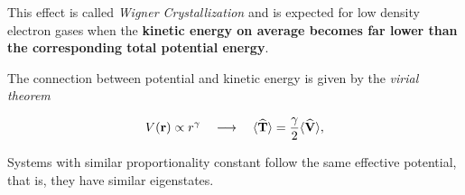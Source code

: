 \begin{frame}
 This effect is called \textit{Wigner Crystallization} and is expected for low density electron gases when the \textbf{kinetic energy on average becomes far lower than the corresponding total potential energy}.
 \shift
 
 The connection between potential and kinetic energy is given by the \textit{virial theorem}
 
 \begin{equation}
  V(\mathbf{r}) \propto r^\gamma \quad\longrightarrow\quad \langle {\bf\widehat{T}} \rangle = \frac{\gamma}{2} \langle {\bf\widehat{V}} \rangle, \label{eq:virial}
 \end{equation}
 \shift
 
 Systems with similar proportionality constant follow the same effective potential, that is, they have similar eigenstates.

\end{frame}

